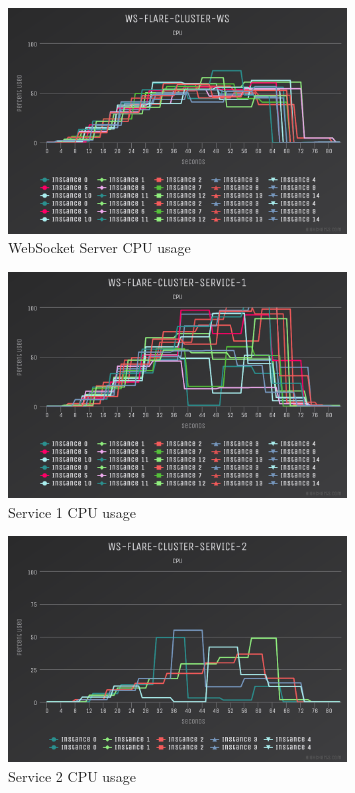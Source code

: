 \begin{figure}[H]
  \centering
    \includegraphics[width=0.8\textwidth]{figures/experiments/experiment-2/10000/ws-cpu-10000.png}
    \caption{WebSocket Server CPU usage}
    \label{fig:experiment-2-ws-cpu-10000}
\end{figure}

\begin{figure}[H]
  \centering
    \includegraphics[width=0.8\textwidth]{figures/experiments/experiment-2/10000/service1-cpu-10000.png}
    \caption{Service 1 CPU usage}
    \label{fig:experiment-2-service-1-cpu-10000}
\end{figure}

\begin{figure}[H]
  \centering
    \includegraphics[width=0.8\textwidth]{figures/experiments/experiment-2/10000/service2-cpu-10000.png}
    \caption{Service 2 CPU usage}
    \label{fig:experiment-2-service-2-cpu-10000}
\end{figure}

